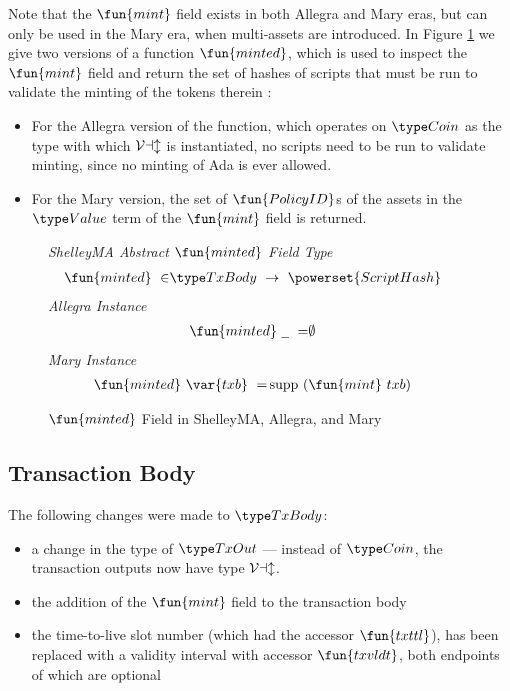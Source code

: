 Note that the $\fun{mint}$ field exists in both Allegra and Mary eras,
but can only be used in the Mary era, when multi-assets are introduced.
In Figure \ref{fig:minted} we give two versions of a function $\fun{minted}$,
which is used to inspect the $\fun{mint}$ field and return the set of hashes
of scripts that must be run to validate the minting of the tokens therein :

\begin{itemize}
  \item For the Allegra version of the function, which operates on $\Coin$ as the
  type with which $\mathcal{Val}$ is instantiated, no scripts need to be run
  to validate minting, since no minting of Ada is ever allowed.

  \item For the Mary version, the set of $\fun{PolicyID}$s of the
  assets in the $\Value$ term of the $\fun{mint}$ field is returned.
\end{itemize}

\begin{figure*}[t!]
  \emph{ShelleyMA Abstract $\fun{minted}$ Field Type}
  \begin{align*}
    \fun{minted}~\in& \TxBody~\to~\powerset{ScriptHash}
  \end{align*}
  \emph{Allegra Instance}
  \begin{align*}
    \fun{minted}~\wcard~=& \emptyset
  \end{align*}
  \emph{Mary Instance}
  \begin{align*}
    \fun{minted}~\var{txb}~=& \supp~(\fun{mint}~{txb})
  \end{align*}
  \caption{$\fun{minted}$ Field in ShelleyMA, Allegra, and Mary}
  \label{fig:minted}
\end{figure*}

\subsection*{Transaction Body}

The following changes were made to $\TxBody$:

\begin{itemize}
  \item a change in the type of $\TxOut$ --- instead of
$\Coin$, the transaction outputs now have type $\mathcal{Val}$.
  \item the addition of the $\fun{mint}$ field to the transaction body
  \item the time-to-live slot number (which had the accessor $\fun{txttl}$),
  has been replaced with a validity interval with accessor $\fun{txvldt}$,
  both endpoints of which are optional
\end{itemize}

